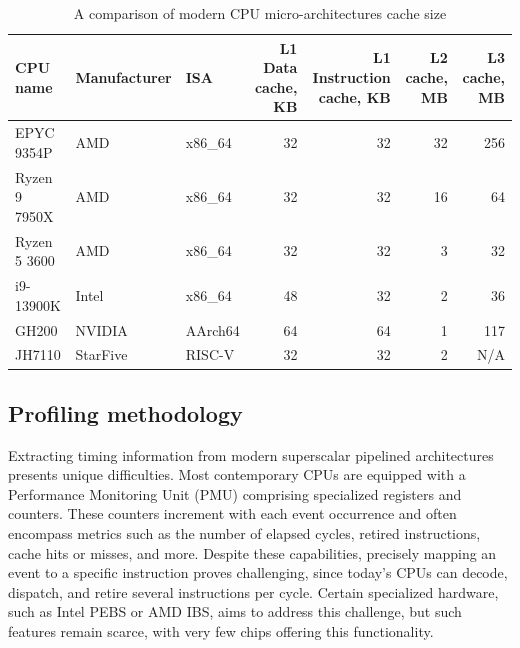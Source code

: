 \begin{table}[!t]
        \renewcommand{\arraystretch}{1.3}
        \caption{A comparison of modern CPU micro-architectures cache size}
        \centering
	\begin{tabular}{lllrrrr}
	        \hline
		CPU name      & Manufacturer & ISA     & L1 Data cache, KB                        & L1 Instruction cache, KB & L2 cache, MB & L3 cache, MB \\
		\hline
		EPYC 9354P    & AMD          & x86\_64 & 32                                       & 32                       & 32           & 256          \\
		Ryzen 9 7950X & AMD          & x86\_64 & 32                                       & 32                       & 16           & 64           \\
		Ryzen 5 3600  & AMD          & x86\_64 & 32                                       & 32                       & 3            & 32           \\
		i9-13900K     & Intel        & x86\_64 & 48                                       & 32                       & 2            & 36           \\
		GH200         & NVIDIA       & AArch64 & 64                                       & 64                       & 1            & 117          \\
		JH7110        & StarFive     & RISC-V  & 32                                       & 32                       & 2            & N/A
	\end{tabular}
        \label{tab:caches}
\end{table}

\subsection{Profiling methodology}

Extracting timing information from modern superscalar pipelined architectures presents unique difficulties.
Most contemporary CPUs are equipped with a Performance Monitoring Unit (PMU) comprising specialized registers
and counters. These counters increment with each event occurrence and often encompass metrics such as the 
number of elapsed cycles, retired instructions, cache hits or misses, and more. Despite these capabilities, 
precisely mapping an event to a specific instruction proves challenging, since today's CPUs can decode, 
dispatch, and retire several instructions per cycle. Certain specialized hardware, such as Intel PEBS or 
AMD IBS, aims to address this challenge, but such features remain scarce, with very few chips offering this 
functionality\cite{bakhvalovPerformanceAnalysisTuning2020}.

